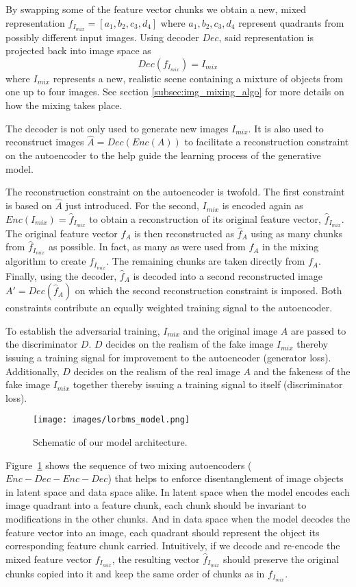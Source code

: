 \documentclass[12pt,a4paper]{article}
\begin{document}
By swapping some of the feature vector chunks we obtain a new, mixed representation $f_{I_{mix}} = [a_1, b_2, c_3, d_4]$ where $a_1,b_2,c_3,d_4$ represent quadrants from possibly different input images. Using decoder $Dec$, said representation is projected back into image space as
\begin{equation} \label{eq:3}
    Dec(f_{I_{mix}}) = I_{mix}
\end{equation}
where $I_{mix}$ represents a new, realistic scene containing a mixture of objects from one up to four images. See section \ref{subsec:img_mixing_algo} for more details on how the mixing takes place.

The decoder is not only used to generate new images $I_{mix}$. It is also used to reconstruct images $\hat{A} = Dec(Enc(A))$ to facilitate a reconstruction constraint on the autoencoder to the help guide the learning process of the generative model.

The reconstruction constraint on the autoencoder is twofold. The first constraint is based on $\hat{A}$ just introduced. For the second, $I_{mix}$ is encoded again as $Enc(I_{mix}) = \hat{f}_{I_{mix}}$ to obtain a reconstruction of its original feature vector, $\hat{f}_{I_{mix}}$. The original feature vector $f_A$ is then reconstructed as $\hat{f}_A$ using as many chunks from $\hat{f}_{I_{mix}}$ as possible. In fact, as many as were used from $f_A$ in the mixing algorithm to create $f_{I_{mix}}$. The remaining chunks are taken directly from $f_A$. Finally, using the decoder, $\hat{f}_A$ is decoded into a second reconstructed image $A' = Dec(\hat{f}_A)$ on which the second reconstruction constraint is imposed. Both constraints contribute an equally weighted training signal to the autoencoder.

To establish the adversarial training, $I_{mix}$ and the original image $A$ are passed to the discriminator $D$. $D$ decides on the realism of the fake image $I_{mix}$ thereby issuing a training signal for improvement to the autoencoder (generator loss). Additionally, $D$ decides on the realism of the real image $A$ and the fakeness of the fake image $I_{mix}$ together thereby issuing a training signal to itself (discriminator loss).

\begin{figure}[ht]
\centering
\texttt{[image: images/lorbms\_model.png]}
\caption{Schematic of our model architecture.}
\label{fig:model_arch}
\end{figure}

Figure~\ref{fig:model_arch} shows the sequence of two mixing autoencoders ($Enc-Dec-Enc-Dec$) that helps to enforce disentanglement of image objects in latent space and data space alike. In latent space when the model encodes each image quadrant into a feature chunk, each chunk should be invariant to modifications in the other chunks. And in data space when the model decodes the feature vector into an image, each quadrant should represent the object its corresponding feature chunk carried. Intuitively, if we decode and re-encode the mixed feature vector $f_{I_{mix}}$, the resulting vector $\hat{f}_{I_{mix}}$ should preserve the original chunks copied into it and keep the same order of chunks as in $f_{I_{mix}}$.
\end{document}
